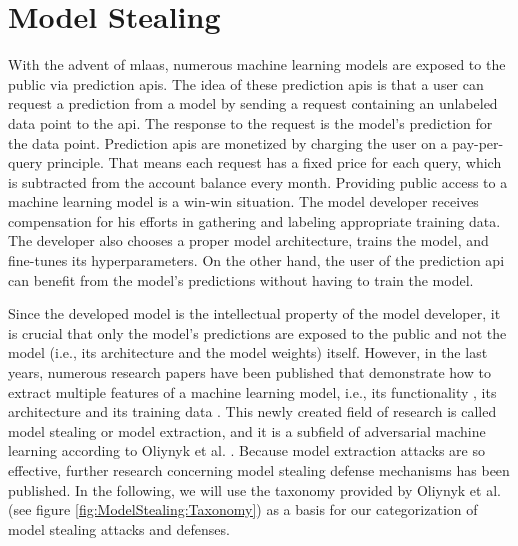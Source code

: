 \section{Model Stealing}
\label{sec:ModelStealing}
With the advent of \gls{mlaas}, numerous machine learning models are exposed to the public via 
prediction \glspl{api}. The idea of these prediction \glspl{api} is that a user can request a prediction from a model by sending a request containing an unlabeled data
point to the \gls{api}. The response to the request is the model's prediction for the data point. Prediction \glspl{api} are monetized by charging the user
on a pay-per-query principle. That means each request has a fixed price for each query, which is subtracted from the account balance every month. 
Providing public access to a machine learning model is a win-win situation. The model developer receives compensation for his efforts in gathering and labeling
appropriate training data. The developer also chooses a proper model architecture, trains the model, and fine-tunes its hyperparameters. On the other hand,
the user of the prediction \gls{api} can benefit from the model's predictions without having to train the model. \par
Since the developed model is the intellectual property of the model developer, it is crucial that only the model's predictions are exposed to the public and
not the model (i.e., its architecture and the model weights) itself. However, in the last years, numerous research papers have been published that demonstrate how
to extract multiple features of a machine learning model, i.e., its functionality \cite{tramer2016stealing}, its architecture \cite{oh2019towards} and its
training data \cite{shokri2017membership}. This newly created field of research is called model stealing or model extraction, and it is a subfield
of adversarial machine learning according to Oliynyk et al. \cite{oliynyk2022know}. Because model extraction attacks are so effective, further research
concerning model stealing defense mechanisms has been published. In the following, we will use the taxonomy provided by Oliynyk et al. (see figure 
\ref{fig:ModelStealing:Taxonomy}) \cite{oliynyk2022know} as a basis for our categorization of model stealing attacks and defenses.

